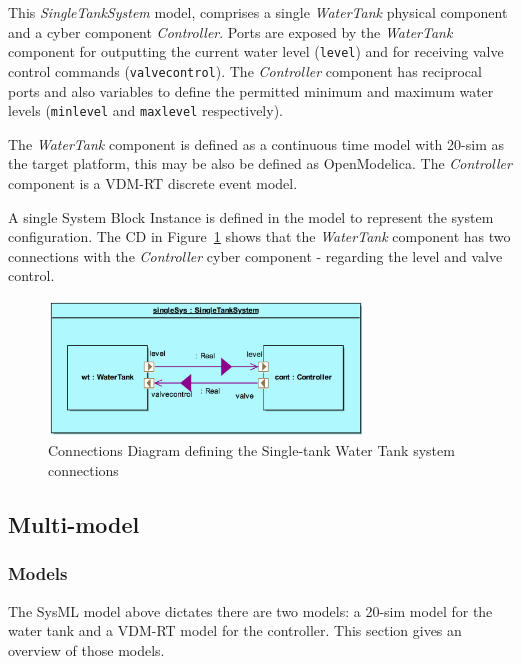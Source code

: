 This \emph{SingleTankSystem} model, comprises  a single \emph{WaterTank} physical component and  a cyber component \emph{Controller}. Ports are exposed by the  \emph{WaterTank} component for outputting the current water level (\texttt{level}) and for receiving valve control commands (\texttt{valvecontrol}). The \emph{Controller} component has reciprocal ports and also variables to define the permitted minimum and maximum water levels (\texttt{minlevel} and \texttt{maxlevel} respectively).

The \emph{WaterTank} component is defined as a continuous time model with 20-sim as the target platform, this may be also be defined as OpenModelica. The \emph{Controller} component is a VDM-RT discrete event model. 

A single System Block Instance is defined in the model to represent the system configuration. The CD in Figure~\ref{fig:singletankcd} shows that the \emph{WaterTank} component has two connections with the \emph{Controller} cyber component - regarding the level and valve control.

\begin{figure}[htbp]
\begin{center}
\includegraphics[width=0.75\textwidth]{singletank/sysml_cd.png}
\caption{Connections Diagram defining the Single-tank Water Tank system connections}
\label{fig:singletankcd}
\end{center}
\end{figure}

\subsection{Multi-model}
\label{sec:singletank_into_mm}

\subsubsection{Models}
\label{sec:singletank_into_models}

The SysML model above dictates there are two models: a 20-sim model for the water tank and a VDM-RT model for the controller. This section gives an overview of those models.

